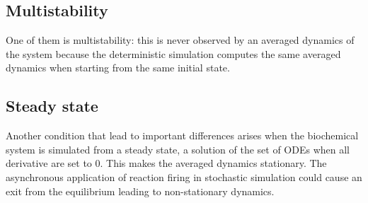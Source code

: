   \subsection{Multistability}
  One of them is multistability: this is never observed by an averaged dynamics of the system because the deterministic simulation computes the same averaged dynamics when starting from the same initial state.

  \subsection{Steady state}
  Another condition that lead to important differences arises when the biochemical system is simulated from a steady state, a solution of the set of ODEs when all derivative are set to $0$.
  This makes the averaged dynamics stationary.
  The asynchronous application of reaction firing in stochastic simulation could cause an exit from the equilibrium leading to non-stationary dynamics.
